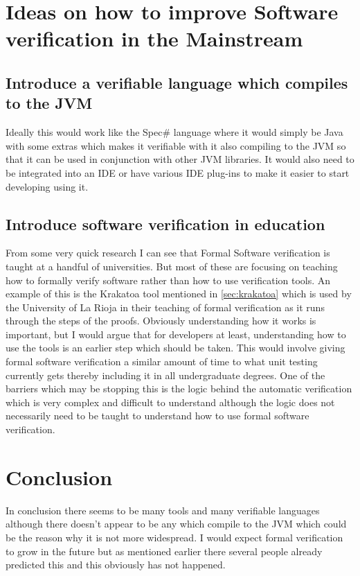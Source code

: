 \documentclass[a4paper,12pt]{scrartcl}
\begin{document}
	\section{Ideas on how to improve Software verification in the Mainstream}
	{
		\subsection{Introduce a verifiable language which compiles to the JVM}
		{
			Ideally this would work like the Spec\# language where it would simply be Java with some extras which makes it verifiable with it also compiling to the JVM so that it can be used in conjunction with other JVM libraries. It would also need to be integrated into an IDE or have various IDE plug-ins to make it easier to start developing using it.
		}
		\subsection{Introduce software verification in education}
		{
			From some very quick research I can see that Formal Software verification is taught at a handful of universities. But most of these are focusing on teaching how to formally verify software rather than  how to use verification tools. An example of this is the Krakatoa tool mentioned in \cref{sec:krakatoa} which is used by the University of La Rioja in their teaching of formal verification as it runs through the steps of the proofs\cite{Romero2018}. Obviously understanding how it works is important, but I would argue that for developers at least, understanding how to use the tools is an earlier step which should be taken. This would involve giving formal software verification a similar amount of time to what unit testing currently gets thereby including it in all undergraduate degrees. One of the barriers which may be stopping this is the logic behind the automatic verification which is very complex and difficult to understand although the logic does not necessarily need to be taught to understand how to use formal software verification. 
		}
	}
	
	\section{Conclusion}
	{
		In conclusion there seems to be many tools and many verifiable languages although there doesn't appear to be any which compile to the JVM which could be the reason why it is not more widespread. I would expect formal verification to grow in the future but as mentioned earlier there several people already predicted this and this obviously has not happened. 
	}
	
	\newpage
	
	\printbibliography[heading=bibintoc,title=References]
\end{document}
